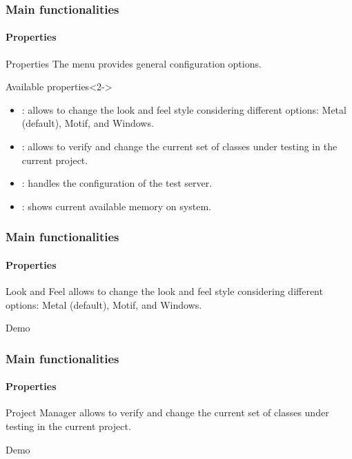 \begin{frame}[parent={cmap:jabuti-gui},hasnext=true,hasprev=true]
\frametitle{Main functionalities}
\framesubtitle{Properties}
\label{concept:properties-menu}

\begin{block}{Properties}
The  menu provides general configuration options.
\end{block}

\begin{block}{Available properties}<2->
\begin{itemize}
	\item<+-> : allows to change the look and feel
	style considering different options: Metal (default), Motif, and
	Windows.

	\item<+-> : allows to verify and change the
	current set of classes under testing in the current project.

	\item<+-> : handles the configuration of the test
	server.

	\item<+-> : shows current available
	memory on system.
\end{itemize}
\end{block}
\end{frame}


\begin{frame}
\frametitle{Main functionalities}
\framesubtitle{Properties}
\label{concept:look-and-feel}

\begin{block}{Look and Feel}
 allows to change the look and feel style considering
different options: Metal (default), Motif, and Windows.
\end{block}

\begin{block}{Demo}
\end{block}
\end{frame}


\begin{frame}
\frametitle{Main functionalities}
\framesubtitle{Properties}
\label{concept:project-manager}

\begin{block}{Project Manager}
 allows to verify and change the current set of
classes under testing in the current project.
\end{block}

\begin{block}{Demo}
\end{block}
\end{frame}


